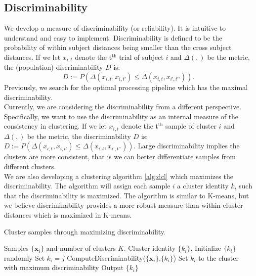 \documentclass[simplex.tex]{subfiles}
\providecommand{\mb}[1]{\boldsymbol{#1}}
\newcommand{\bx}{\mb{x}}
\begin{document}
\subsection{Discriminability}
We develop a measure of discriminability (or reliability).  It
is intuitive to understand and easy to implement.
Discriminability is defined to be the probability of within
subject distances being smaller than the cross subject
distances. If we let $x_{i,t}$ denote the t$^{\text{th}}$ trial of subject 
$i$ and $\Delta(,)$ be the metric, the (population) discriminability $D$
is: 
\[D:= P (\Delta(x_{i,t} , x_{i,t’}) \leq  \Delta(x_{i,t} , x_{i’,t’’})).\]
Previously, we search for the optimal processing pipeline which has the
maximal discriminability. 
\\
Currently, we are considering the discriminability from a different perspective. Specifically, we want to use the discriminability as an internal measure of the consistency in clustering. If we let $x_{i,t}$ denote the t$^{\text{th}}$ sample of cluster 
$i$ and $\Delta(,)$ be the metric, the discriminability $D$
is: $D:= P (\Delta(x_{i,t} , x_{i,t’}) \leq  \Delta(x_{i,t} , x_{i’,t’’}))$. Large discriminability implies the clusters are more consistent, that is we can better differentiate samples from different clusters. 
\\
We are also developing a clustering algorithm \ref{alg:dcl} which maximizes the discriminability. The algorithm will assign each sample $i$ a cluster identity $k_i$ such that the discriminability is maximized. The algorithm is similar to K-means, but we believe discriminability provides a more robust measure than within cluster distances which is maximized in K-means.
\begin{algorithm}               
	\caption{Cluster samples through maximizing discriminability.  }   
	\label{alg:dcl}                       
	\begin{algorithmic}                    
		\Require Samples $\{\bx_{i}\}$ and number of clusters $K$.
		\Ensure Cluster identity $\{k_{i}\}$. 
		\State Initialize $\{k_{i}\}$ randomly
		\State Set $k_{i} = j$ 
		\State ComputeDiscriminability($\{\bx_{i}\}$,$\{k_{i}\}$)
		\EndFor
		\State Set $k_{i}$ to the cluster with maximum discriminability
		\EndFor 
		\EndWhile
		\State Output $\{k_{i}\}$ 
		\EndFunction
	\end{algorithmic}
\end{algorithm}
\end{document}
